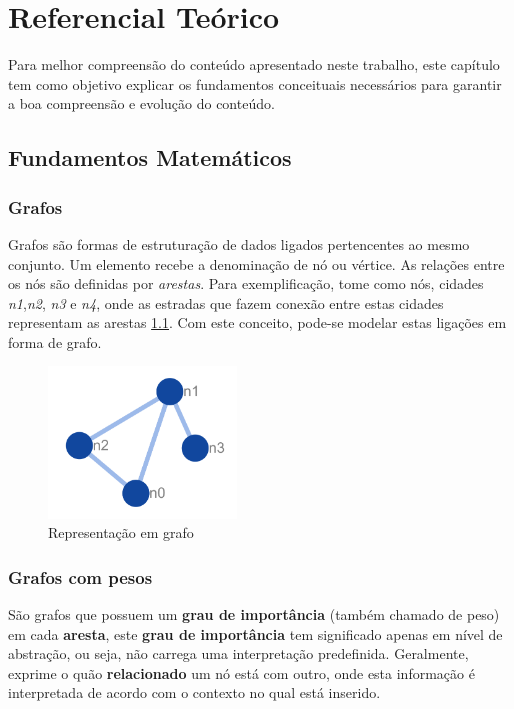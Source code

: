 \chapter{Referencial Teórico}

	 
\par
    Para melhor compreensão do conteúdo apresentado neste trabalho, este capítulo tem como objetivo explicar os fundamentos conceituais necessários para garantir a boa compreensão e evolução do conteúdo.
    
\section{Fundamentos Matemáticos}

\subsection{Grafos}
Grafos são formas de estruturação de dados ligados pertencentes ao mesmo conjunto. Um elemento recebe a denominação de nó ou vértice. As relações entre os nós são definidas por \textit{arestas}.
Para exemplificação, tome como nós, cidades \textit{n1},\textit{n2}, \textit{n3} e \textit{n4}, onde as estradas que fazem conexão entre estas cidades representam as arestas \ref{graph_base}. Com este conceito, pode-se modelar estas ligações em forma de grafo. \cite{Graph_teory}
%
\begin{figure}[ht!]
\centering
\includegraphics[width=50mm]{Images/graph_base.png}
\caption {Representação em grafo
\label{graph_base}}
\end{figure}


\subsection{Grafos com pesos}
São grafos que possuem um \textbf{grau de importância} (também chamado de peso) em cada \textbf{aresta}, este \textbf{grau de importância} tem significado apenas em nível de abstração, ou seja, não carrega uma interpretação predefinida. Geralmente, exprime o quão \textbf{relacionado} um nó está com outro, onde esta informação é interpretada de acordo com o contexto no qual está inserido.\cite{Graph_teory}

